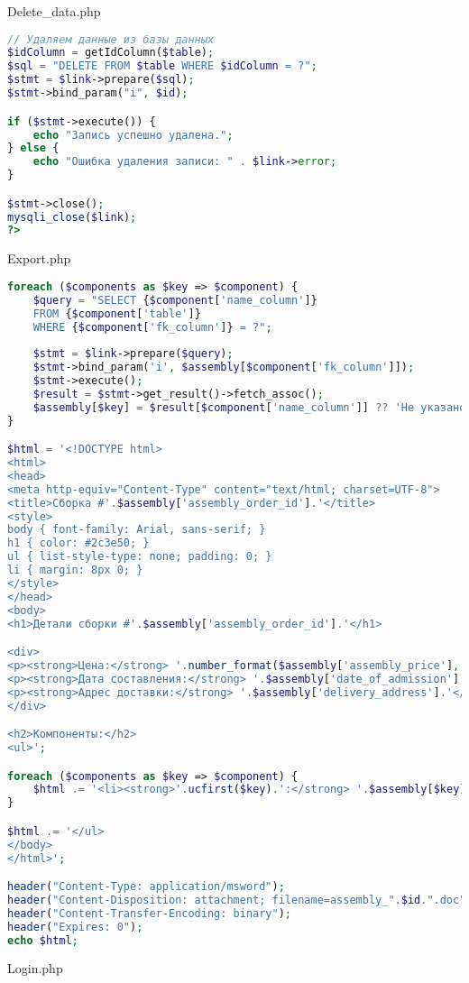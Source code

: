 Delete\_data.php

\begin{lstlisting}[language=PHP, frame=none]
// Удаляем данные из базы данных
$idColumn = getIdColumn($table);
$sql = "DELETE FROM $table WHERE $idColumn = ?";
$stmt = $link->prepare($sql);
$stmt->bind_param("i", $id);

if ($stmt->execute()) {
	echo "Запись успешно удалена.";
} else {
	echo "Ошибка удаления записи: " . $link->error;
}

$stmt->close();
mysqli_close($link);
?>
\end{lstlisting}

Export.php

\begin{lstlisting}[language=php,frame=none]
foreach ($components as $key => $component) {
	$query = "SELECT {$component['name_column']} 
	FROM {$component['table']} 
	WHERE {$component['fk_column']} = ?";
	
	$stmt = $link->prepare($query);
	$stmt->bind_param('i', $assembly[$component['fk_column']]);
	$stmt->execute();
	$result = $stmt->get_result()->fetch_assoc();
	$assembly[$key] = $result[$component['name_column']] ?? 'Не указано';
}

$html = '<!DOCTYPE html>
<html>
<head>
<meta http-equiv="Content-Type" content="text/html; charset=UTF-8">
<title>Сборка #'.$assembly['assembly_order_id'].'</title>
<style>
body { font-family: Arial, sans-serif; }
h1 { color: #2c3e50; }
ul { list-style-type: none; padding: 0; }
li { margin: 8px 0; }
</style>
</head>
<body>
<h1>Детали сборки #'.$assembly['assembly_order_id'].'</h1>

<div>
<p><strong>Цена:</strong> '.number_format($assembly['assembly_price'], 0, '', ' ').' руб.</p>
<p><strong>Дата составления:</strong> '.$assembly['date_of_admission'].'</p>
<p><strong>Адрес доставки:</strong> '.$assembly['delivery_address'].'</p>
</div>

<h2>Компоненты:</h2>
<ul>';

foreach ($components as $key => $component) {
	$html .= '<li><strong>'.ucfirst($key).':</strong> '.$assembly[$key].'</li>';
}

$html .= '</ul>
</body>
</html>';

header("Content-Type: application/msword");
header("Content-Disposition: attachment; filename=assembly_".$id.".doc");
header("Content-Transfer-Encoding: binary");
header("Expires: 0");
echo $html;
\end{lstlisting}

Login.php

